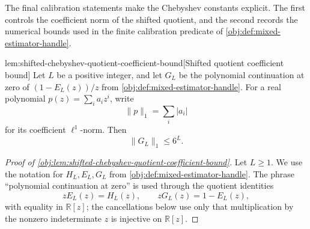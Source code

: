 \documentclass[11pt]{article}
\begin{document}
The final calibration statements make the Chebyshev constants explicit. The first controls the coefficient norm of the shifted quotient, and the second records the numerical bounds used in the finite calibration predicate of \cref{obj:def:mixed-estimator-handle}.

\begin{lemmav}{lem:shifted-chebyshev-quotient-coefficient-bound}[Shifted quotient coefficient bound]
Let \(L\) be a positive integer, and let \(G_L\) be the polynomial continuation at zero of \((1-E_L(z))/z\) from \cref{obj:def:mixed-estimator-handle}.  For a real polynomial \(p(z)=\sum_i a_i z^i\), write
\[
\|p\|_1=\sum_i |a_i|
\]
for its coefficient \(\ell^1\)-norm.  Then
\[
\|G_L\|_1\le 6^L .
\]
\end{lemmav}

\begin{proof}[Proof of \cref{obj:lem:shifted-chebyshev-quotient-coefficient-bound}]
Let \(L\ge 1\). We use the notation for \(H_L,E_L,G_L\) from \cref{obj:def:mixed-estimator-handle}. The phrase ``polynomial continuation at zero'' is used through the quotient identities
\[
zE_L(z)=H_L(z),\qquad zG_L(z)=1-E_L(z),
\]
with equality in \(\mathbb R[z]\); the cancellations below use only that multiplication by the nonzero indeterminate \(z\) is injective on \(\mathbb R[z]\).


\end{proof}
\end{document}
